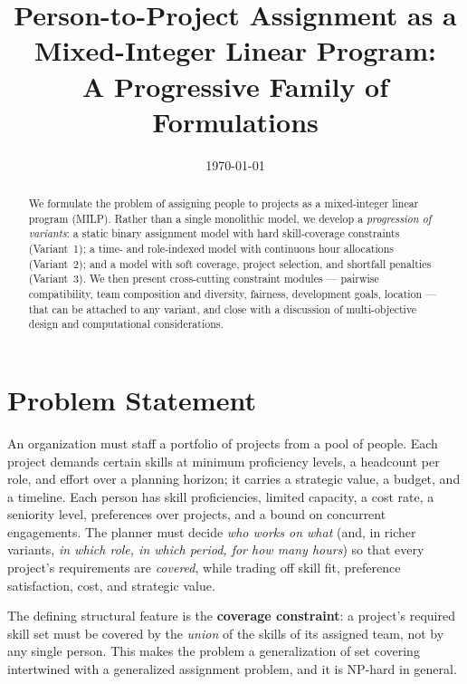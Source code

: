 \documentclass[11pt]{article}
\title{Person-to-Project Assignment as a Mixed-Integer Linear Program:\\
A Progressive Family of Formulations}
\author{}
\date{\today}
\theoremstyle{remark}
\begin{document}
\maketitle

\begin{abstract}
We formulate the problem of assigning people to projects as a mixed-integer
linear program (MILP). Rather than a single monolithic model, we develop a
\emph{progression of variants}: a static binary assignment model with hard
skill-coverage constraints (Variant~1); a time- and role-indexed model with
continuous hour allocations (Variant~2); and a model with soft coverage,
project selection, and shortfall penalties (Variant~3). We then present
cross-cutting constraint modules --- pairwise compatibility, team composition
and diversity, fairness, development goals, location --- that can be attached
to any variant, and close with a discussion of multi-objective design and
computational considerations.
\end{abstract}

\tableofcontents

\section{Problem Statement}

An organization must staff a portfolio of projects from a pool of people.
Each project demands certain skills at minimum proficiency levels, a
headcount per role, and effort over a planning horizon; it carries a
strategic value, a budget, and a timeline. Each person has skill
proficiencies, limited capacity, a cost rate, a seniority level,
preferences over projects, and a bound on concurrent engagements.
The planner must decide \emph{who works on what} (and, in richer variants,
\emph{in which role, in which period, for how many hours}) so that every
project's requirements are \emph{covered}, while trading off skill fit,
preference satisfaction, cost, and strategic value.

The defining structural feature is the \textbf{coverage constraint}: a
project's required skill set must be covered by the \emph{union} of the
skills of its assigned team, not by any single person. This makes the
problem a generalization of set covering intertwined with a generalized
assignment problem, and it is NP-hard in general.

\end{document}

